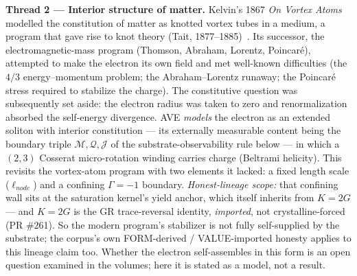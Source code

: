 \vspace{0.5em}
\noindent \textbf{Thread 2 --- Interior structure of matter.} Kelvin's 1867 \emph{On Vortex Atoms}~\cite{kelvin1867vortex} modelled the constitution of matter as knotted vortex tubes in a medium, a program that gave rise to knot theory (Tait, 1877--1885)~\cite{tait1877knots}. Its successor, the electromagnetic-mass program (Thomson, Abraham, Lorentz, Poincar\'e), attempted to make the electron its own field and met well-known difficulties (the $4/3$ energy--momentum problem; the Abraham--Lorentz runaway; the Poincar\'e stress required to stabilize the charge). The constitutive question was subsequently set aside: the electron radius was taken to zero and renormalization absorbed the self-energy divergence. AVE \emph{models} the electron as an extended soliton with interior constitution --- its externally measurable content being the boundary triple $\mathcal{M}, \mathcal{Q}, \mathcal{J}$ of the substrate-observability rule below --- in which a $(2,3)$ Cosserat micro-rotation winding carries charge (Beltrami helicity). This revisits the vortex-atom program with two elements it lacked: a fixed length scale ($\ell_{node}$) and a confining $\Gamma = -1$\gammaundeclared{} boundary. \emph{Honest-lineage scope:} that confining wall sits at the saturation kernel's yield anchor, which itself inherits from $K = 2G$ --- and $K = 2G$ is the GR trace-reversal identity, \emph{imported}, not crystalline-forced (PR \#261). So the modern program's stabilizer is not fully self-supplied by the substrate; the corpus's own FORM-derived / VALUE-imported honesty applies to this lineage claim too. Whether the electron self-assembles in this form is an open question examined in the volumes; here it is stated as a model, not a result.

